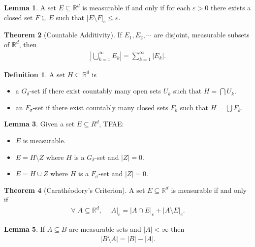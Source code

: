 \documentclass[a4paper,9pt]{extarticle}
\theoremstyle{definition}
\newtheorem{defin}{Definition}
\newtheorem{thm}{Theorem}
\newtheorem{lem}[thm]{Lemma}
\begin{document}
\begin{lem}
    A set $E \subseteq \mathbb{R}^d$ is measurable if and only if for each $\varepsilon > 0$ there exists a closed set $F \subseteq E$ such that $|E \setminus F|_e \leq \varepsilon$.
\end{lem}
\begin{thm}[Countable Additivity]
    If $E_1, E_2, \cdots$ are disjoint, measurable subsets of $\mathbb{R}^d$, then
    \begin{align*}
        \left| \bigcup_{k = 1}^\infty E_k \right| = \sum_{k = 1}^\infty |E_k|.
    \end{align*}
\end{thm}
\begin{defin}
    A set $H \subseteq \mathbb{R}^d$ is
    \begin{itemize}[itemsep=0ex]
        \item
            a $G_\delta$-set if there exist countably many open sets $U_k$ such that $H = \bigcap U_k$.
        \item
            an $F_\sigma$-set if there exist countably many closed sets $F_k$ such that $H = \bigcup F_k$.
    \end{itemize}
\end{defin}
\begin{lem}
    Given a set $E \subseteq R^d$, TFAE:
    \begin{itemize}[itemsep=0ex]
        \item
            $E$ is measurable.
        \item
            $E = H \setminus Z$ where $H$ is a $G_\delta$-set and $|Z| = 0$.
        \item
            $E = H \cup Z$ where $H$ is a $F_\sigma$-set and $|Z| = 0$.
    \end{itemize}
\end{lem}
\begin{thm}[Carath\'eodory's Criterion]
    A set $E \subseteq \mathbb{R}^d$ is measurable if and only if
    \begin{align*}
        \forall\; A \subseteq \mathbb{R}^d, \quad |A|_e = |A \cap E|_e + |A \setminus E|_e.
    \end{align*}
\end{thm}
\begin{lem}
    If $A \subseteq B$ are measurable sets and $|A| < \infty$ then
    \begin{align*}
        |B \setminus A| = |B| - |A|.
    \end{align*}
\end{lem}
\end{document}
